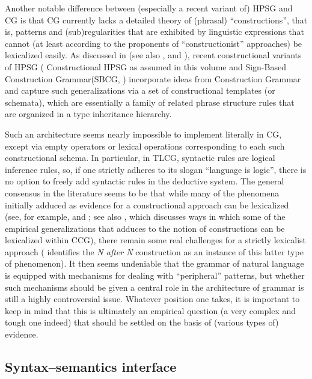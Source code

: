 \documentclass[output=paper,biblatex,babelshorthands,newtxmath,draftmode,colorlinks,citecolor=brown]{langscibook}
\begin{document}
\enlargethispage{3pt}
Another notable difference between (especially a recent variant of)
HPSG and CG is that CG currently lacks a detailed theory of (phrasal)
``constructions'', that is, patterns and (sub)regularities that are
exhibited by linguistic expressions that cannot (at least according to
the proponents of ``constructionist'' approaches) be lexicalized easily.
As discussed in  (see also
\citealt{Sag97a}, \citealt{Fillmore99a} and \citealt{GSag2000a-u}),  recent constructional variants
of HPSG (\eg {} Constructional HPSG as assumed in this volume and Sign-Based Construction
Grammar\indexsbcg (SBCG, \citealp*{SBK2012a}) incorporate ideas from Construction Grammar\indexcxg 
\citep{FKoC88a} and capture such
generalizations via a set of constructional templates (or schemata),
which are essentially a family of related phrase structure rules that
are organized in a type inheritance hierarchy.

Such an architecture seems nearly impossible to implement literally in
CG, except via empty operators or lexical operations corresponding to
each such constructional schema. In particular, in TLCG, syntactic
rules are logical inference rules, so, if one strictly adheres to its
slogan ``language is logic'', there is no option to freely add
syntactic rules in the deductive system. The general consensus in the
literature seems to be that while many of the phenomena initially
adduced as evidence for a constructional approach can be lexicalized
(see, for example,  and ; see also
, which discusses ways in which some of the
empirical generalizations that  adduces to the
notion of constructions can be lexicalized within CCG), there remain
some real challenges for a strictly lexicalist approach
( identifies the \textit{N after N}
construction as an instance of this latter type of phenomenon). It
then seems undeniable that the grammar of natural language is equipped with
mechanisms for dealing with ``peripheral'' patterns, but whether such
mechanisms should be given a central role in the architecture of
grammar is still a highly controversial issue. Whatever position one
takes, it is important to keep in mind that this is ultimately an
empirical question (a very complex and tough one indeed) that
should be settled on the basis of (various types of) evidence.



\subsection{Syntax--semantics interface }
\end{document}
